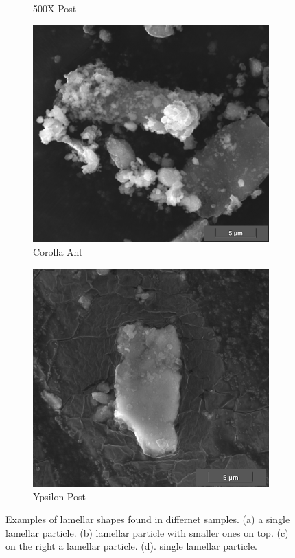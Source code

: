 \begin{figure}[H]
\begin{subfigure}{0.43\linewidth}
		\caption{500X Post}
		\label{fig:500X_Post_Lamellar}
	    \end{subfigure}
	\vfill
	     \begin{subfigure}{0.45\linewidth}
		 \includegraphics[width=\linewidth]{images/COROLLA ANT05 lamellar.png}
		 \caption{Corolla Ant}
		 \label{fig:Corolla_Ant_Lamellar}
	      \end{subfigure}
	       \begin{subfigure}{0.45\linewidth}
		  \includegraphics[width=\linewidth]{images/YPSILON POST10 lamellar.png}
		  \caption{Ypsilon Post}
		  \label{fig:Ypsilon_Post_Lamellar}
	       \end{subfigure}
\caption{Examples of lamellar shapes found in differnet samples. (a) a single lamellar particle. (b) lamellar particle with smaller ones on top. (c) on the right a lamellar particle. (d). single lamellar particle. }
	\label{fig:Lamellar}
\end{figure}




